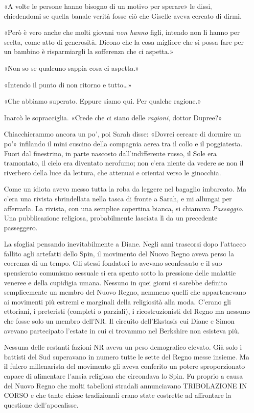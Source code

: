 «A volte le persone hanno bisogno di un motivo per sperare» le dissi,
chiedendomi se quella banale verità fosse ciò che Giselle aveva cercato
di dirmi.

«Però è vero anche che molti giovani \emph{non hanno} figli, intendo non
li hanno per scelta, come atto di generosità. Dicono che la cosa
migliore che si possa fare per un bambino è risparmiargli la sofferenza
che ci aspetta.»

«Non so se qualcuno sappia cosa ci aspetta.»

«Intendo il punto di non ritorno e tutto\ldots»

«Che abbiamo superato. Eppure siamo qui. Per qualche ragione.»

Inarcò le sopracciglia. «Crede che ci siano delle \emph{ragioni}, dottor
Dupree?»

Chiacchierammo ancora un po', poi Sarah disse: «Dovrei cercare di
dormire un po'» infilando il mini cuscino della compagnia aerea tra il
collo e il poggiatesta. Fuori dal finestrino, in parte nascosto
dall'indifferente russo, il Sole era tramontato, il cielo era diventato
nerofumo; non c'era niente da vedere se non il riverbero della luce da
lettura, che attenuai e orientai verso le ginocchia.

Come un idiota avevo messo tutta la roba da leggere nel bagaglio
imbarcato. Ma c'era una rivista sbrindellata nella tasca di fronte a
Sarah, e mi allungai per afferrarla. La rivista, con una semplice
copertina bianca, si chiamava \emph{Passaggio}. Una pubblicazione
religiosa, probabilmente lasciata lì da un precedente passeggero.

La sfogliai pensando inevitabilmente a Diane. Negli anni trascorsi dopo
l'attacco fallito agli artefatti dello Spin, il movimento del Nuovo
Regno aveva perso la coerenza di un tempo. Gli stessi fondatori lo
avevano sconfessato e il suo spensierato comunismo sessuale si era
spento sotto la pressione delle malattie veneree e della cupidigia
umana. Nessuno in quei giorni si sarebbe definito semplicemente un
membro del Nuovo Regno, nemmeno quelli che appartenevano ai movimenti
più estremi e marginali della religiosità alla moda. C'erano gli
ettoriani, i preteristi (completi o parziali), i ricostruzionisti del
Regno ma nessuno che fosse solo un membro dell'NR. Il circuito
dell'Ekstasis cui Diane e Simon avevano partecipato l'estate in cui ci
trovammo nel Berkshire non esisteva più.

Nessuna delle restanti fazioni NR aveva un peso demografico elevato. Già
solo i battisti del Sud superavano in numero tutte le sette del Regno
messe insieme. Ma il fulcro millenarista del movimento gli aveva
conferito un potere sproporzionato capace di alimentare l'ansia
religiosa che circondava lo Spin. Fu proprio a causa del Nuovo Regno che
molti tabelloni stradali annunciavano T{RIBOLAZIONE IN CORSO} e che
tante chiese tradizionali erano state costrette ad affrontare la
questione dell'apocalisse.

